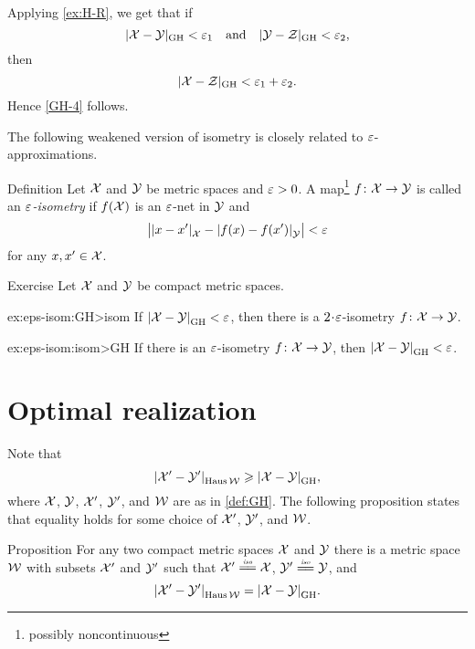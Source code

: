 Applying \ref{ex:H-R}, we get that if 
\[|\mathcal{X}-\mathcal{Y}|_{\operatorname{\rm GH}\nolimits}<\varepsilon_1
\quad\text{and}\quad
|\mathcal{Y}-\mathcal{Z}|_{\operatorname{\rm GH}\nolimits}<\varepsilon_2,
\]
then 
\[|\mathcal{X}-\mathcal{Z}|_{\operatorname{\rm GH}\nolimits}<\varepsilon_1+\varepsilon_2.\]
Hence \ref{GH-4} follows.
\qeds

The following weakened version of isometry is closely related to $\varepsilon$-approximations.

\begin{thm}{Definition} Let $\mathcal{X}$ and $\mathcal{Y}$ be metric spaces and $\varepsilon>0$. 
A  map\footnote{possibly noncontinuous} $f\: \spc{X} \z\to \spc{Y}$ is called an \emph{$\varepsilon$-isometry} 
if $f(\mathcal{X})$ is an $\varepsilon$-net in $\mathcal{Y}$ and
\[\bigl|\dist{x}{x'}{\spc{X}}-\dist{f(x)}{f(x')}{\spc{Y}}\bigr|<\eps\]
for any $x,x'\in \mathcal{X}$.
\end{thm}

\begin{thm}{Exercise}\label{ex:eps-isom}
Let $\mathcal{X}$ and $\mathcal{Y}$ be compact metric spaces.

\begin{subthm}{ex:eps-isom:GH>isom}
If $\dist{\spc{X}}{\spc{Y}}{\GH}<\eps$, then there is a $2\cdot\eps$-isometry $f\colon\mathcal{X}\to\mathcal{Y}$.
\end{subthm}

\begin{subthm}{ex:eps-isom:isom>GH}
If there is an $\varepsilon$-isometry $f\colon\mathcal{X}\to\mathcal{Y}$, then $\dist{\spc{X}}{\spc{Y}}{\GH}<\eps$.
\end{subthm}

\end{thm}

\section{Optimal realization}\label{sec:extfun=GH}

Note that
\[\dist{\spc{X}'}{\spc{Y}'}{\Haus\spc{W}}\ge \dist{\spc{X}}{\spc{Y}}{\GH},\]
where $\mathcal{X}$, $\mathcal{Y}$, $\mathcal{X}'$, $\mathcal{Y}'$, and $\mathcal{W}$ are as in \ref{def:GH}.
The following proposition states that equality holds for some choice of $\mathcal{X}'$, $\mathcal{Y}'$, and $\mathcal{W}$.

\begin{thm}{Proposition}\label{prop:GH=H}
For any two compact metric spaces $\mathcal{X}$ and $\mathcal{Y}$ there is a metric space $\mathcal{W}$
with subsets $\mathcal{X}'$ and $\mathcal{Y}'$ such that 
$\spc{X}'\iso\spc{X}$, $\spc{Y}'\iso\spc{Y}$, and 
\[\dist{\spc{X}'}{\spc{Y}'}{\Haus\spc{W}}=\dist{\spc{X}}{\spc{Y}}{\GH}.\]
\end{thm}

